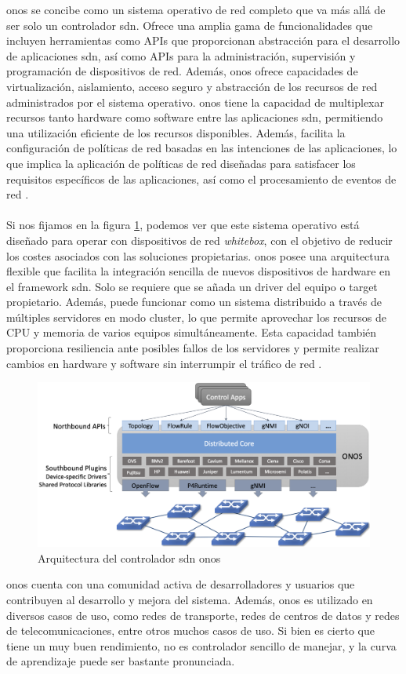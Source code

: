 \gls{onos} se concibe como un sistema operativo de red completo que va más allá de ser solo un controlador \gls{sdn}. Ofrece una amplia gama de funcionalidades que incluyen herramientas como APIs que proporcionan abstracción para el desarrollo de aplicaciones \gls{sdn}, así como APIs para la administración, supervisión y programación de dispositivos de red. Además, \gls{onos} ofrece capacidades de virtualización, aislamiento, acceso seguro y abstracción de los recursos de red administrados por el sistema operativo. \gls{onos} tiene la capacidad de multiplexar recursos tanto hardware como software entre las aplicaciones \gls{sdn}, permitiendo una utilización eficiente de los recursos disponibles. Además, facilita la configuración de políticas de red basadas en las intenciones de las aplicaciones, lo que implica la aplicación de políticas de red diseñadas para satisfacer los requisitos específicos de las aplicaciones, así como el procesamiento de eventos de red \cite{onos2}. \\
\\
Si nos fijamos en la figura \ref*{fig:onos}, podemos ver que este sistema operativo está diseñado para operar con dispositivos de red \textit{whitebox}, con el objetivo de reducir los costes asociados con las soluciones propietarias. \gls{onos} posee una arquitectura flexible que facilita la integración sencilla de nuevos dispositivos de hardware en el framework \gls{sdn}. Solo se requiere que se añada un driver del equipo o target propietario.  Además, puede funcionar como un sistema distribuido a través de múltiples servidores en modo cluster, lo que permite aprovechar los recursos de CPU y memoria de varios equipos simultáneamente. Esta capacidad también proporciona resiliencia ante posibles fallos de los servidores y permite realizar cambios en hardware y software sin interrumpir el tráfico de red \cite{onos1}.

\begin{figure}[ht]
    \centering
    \includegraphics[width=\textwidth]{archivos/img/teoria/onos.png}
    \caption{Arquitectura del controlador \gls{sdn} onos \cite{onos1}}
    \label{fig:onos}
\end{figure}

\gls{onos} cuenta con una comunidad activa de desarrolladores y usuarios que contribuyen al desarrollo y mejora del sistema. Además, \gls{onos} es utilizado en diversos casos de uso, como redes de transporte, redes de centros de datos y redes de telecomunicaciones, entre otros muchos casos de uso. Si bien es cierto que tiene un muy buen rendimiento, no es controlador sencillo de manejar, y la curva de aprendizaje puede ser bastante pronunciada.